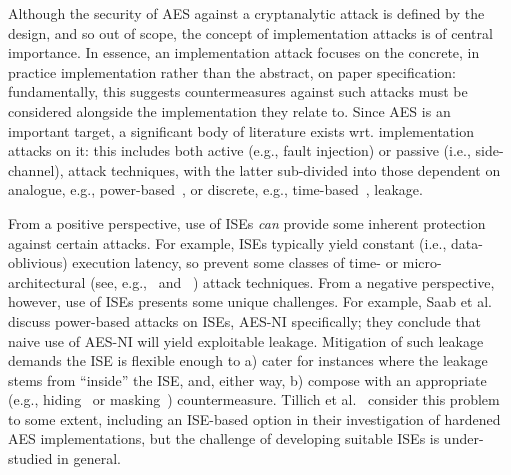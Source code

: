 
Although the security of AES against a cryptanalytic attack is defined by
the design, and so out of scope, the concept of implementation attacks is
of central importance.
In essence, an implementation attack focuses on
the concrete, in practice implementation
rather than
the abstract, on paper     specification:
fundamentally, this suggests countermeasures against such attacks must be
considered alongside the implementation they relate to.
Since AES is an important target, a significant body of literature exists
wrt. implementation attacks on it: this includes both
 active (e.g., fault injection)
or
passive (i.e., side-channel),
attack techniques,
with the latter sub-divided into those dependent on
analogue,
e.g., power-based~\cite{ManOswPop:07},
or
discrete, 
e.g.,  time-based~\cite{KoeQui:99},
leakage.

From a positive perspective, use of ISEs
{\em can} provide some inherent protection against certain attacks.
For example,
ISEs typically yield constant (i.e., data-oblivious) execution latency,
so prevent some classes of time- or micro-architectural
(see, e.g.,~\cite[Section 4]{Szefer:19} and ~\cite[Section 4]{GYCH:18})
attack techniques.
From a negative perspective, however,
use of ISEs presents some unique challenges.
For example, 
Saab et al.\cite{SaaRohHam:16}
discuss power-based attacks on ISEs, AES-NI specifically; they conclude
that naive use of AES-NI will yield exploitable leakage.  Mitigation of
such leakage demands the ISE is flexible enough to 
a) cater for instances where the leakage stems from ``inside'' the ISE,
   and, either way,
b) compose with an appropriate
   (e.g., hiding~\cite[Chapter 7]{ManOswPop:07} or masking~\cite[Chapter 10]{ManOswPop:07})
   countermeasure.
Tillich et al.~\cite{TilHerMan:07}
consider this problem to some extent, including an ISE-based option in
their investigation of hardened AES implementations, but the challenge
of developing suitable ISEs is under-studied in general.

